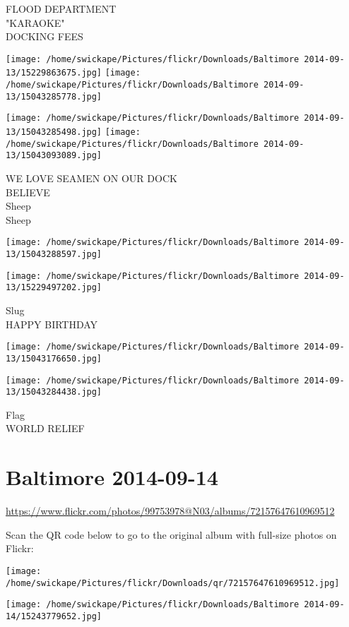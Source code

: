 \documentclass[10pt,letterpaper]{article}
\begin{document}
FLOOD DEPARTMENT\\
"KARAOKE"\\
DOCKING FEES
\pagebreak

\texttt{[image: /home/swickape/Pictures/flickr/Downloads/Baltimore 2014-09-13/15229863675.jpg]}
\texttt{[image: /home/swickape/Pictures/flickr/Downloads/Baltimore 2014-09-13/15043285778.jpg]}

\texttt{[image: /home/swickape/Pictures/flickr/Downloads/Baltimore 2014-09-13/15043285498.jpg]}
\texttt{[image: /home/swickape/Pictures/flickr/Downloads/Baltimore 2014-09-13/15043093089.jpg]}

WE LOVE SEAMEN ON OUR DOCK\\
BELIEVE\\
Sheep\\
Sheep
\pagebreak

\texttt{[image: /home/swickape/Pictures/flickr/Downloads/Baltimore 2014-09-13/15043288597.jpg]}

\vspace{0.25in}
\texttt{[image: /home/swickape/Pictures/flickr/Downloads/Baltimore 2014-09-13/15229497202.jpg]}

Slug\\
HAPPY BIRTHDAY
\pagebreak

\texttt{[image: /home/swickape/Pictures/flickr/Downloads/Baltimore 2014-09-13/15043176650.jpg]}

\vspace{0.25in}
\texttt{[image: /home/swickape/Pictures/flickr/Downloads/Baltimore 2014-09-13/15043284438.jpg]}

Flag\\
WORLD RELIEF
\pagebreak

\section*{Baltimore 2014-09-14}

\url{https://www.flickr.com/photos/99753978@N03/albums/72157647610969512}

Scan the QR code below to go to the original album with full-size photos on Flickr:

\texttt{[image: /home/swickape/Pictures/flickr/Downloads/qr/72157647610969512.jpg]}
\pagebreak

\texttt{[image: /home/swickape/Pictures/flickr/Downloads/Baltimore 2014-09-14/15243779652.jpg]}
\end{document}
